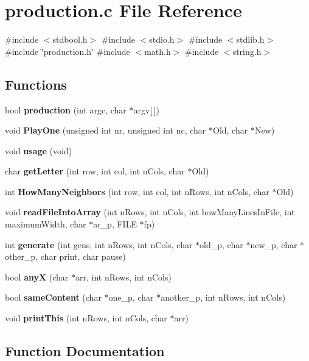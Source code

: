 \section{production.\+c File Reference}
\label{production_8c}
{\ttfamily \#include $<$stdbool.\+h$>$}\newline
{\ttfamily \#include $<$stdio.\+h$>$}\newline
{\ttfamily \#include $<$stdlib.\+h$>$}\newline
{\ttfamily \#include \char`\"{}production.\+h\char`\"{}}\newline
{\ttfamily \#include $<$math.\+h$>$}\newline
{\ttfamily \#include $<$string.\+h$>$}\newline
\subsection*{Functions}
\begin{DoxyCompactItemize}
\item 
bool \textbf{ production} (int argc, char $\ast$argv[$\,$])
\item 
void \textbf{ Play\+One} (unsigned int nr, unsigned int nc, char $\ast$Old, char $\ast$New)
\item 
void \textbf{ usage} (void)
\item 
char \textbf{ get\+Letter} (int row, int col, int n\+Cols, char $\ast$Old)
\item 
int \textbf{ How\+Many\+Neighbors} (int row, int col, int n\+Rows, int n\+Cols, char $\ast$Old)
\item 
void \textbf{ read\+File\+Into\+Array} (int n\+Rows, int n\+Cols, int how\+Many\+Lines\+In\+File, int maximum\+Width, char $\ast$ar\+\_\+p, F\+I\+LE $\ast$fp)
\item 
int \textbf{ generate} (int gens, int n\+Rows, int n\+Cols, char $\ast$old\+\_\+p, char $\ast$new\+\_\+p, char $\ast$other\+\_\+p, char print, char pause)
\item 
bool \textbf{ anyX} (char $\ast$arr, int n\+Rows, int n\+Cols)
\item 
bool \textbf{ same\+Content} (char $\ast$one\+\_\+p, char $\ast$another\+\_\+p, int n\+Rows, int n\+Cols)
\item 
void \textbf{ print\+This} (int n\+Rows, int n\+Cols, char $\ast$arr)
\end{DoxyCompactItemize}


\subsection{Function Documentation}
\mbox{\label{production_8c_a85f4ceb7eddb00ab9989daf800a74d3f}} 
